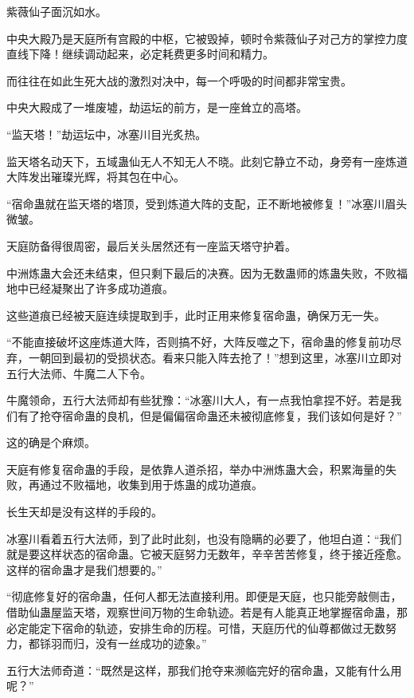 
\begin{this_body}

紫薇仙子面沉如水。

中央大殿乃是天庭所有宫殿的中枢，它被毁掉，顿时令紫薇仙子对己方的掌控力度直线下降！继续调动起来，必定耗费更多时间和精力。

而往往在如此生死大战的激烈对决中，每一个呼吸的时间都非常宝贵。

中央大殿成了一堆废墟，劫运坛的前方，是一座耸立的高塔。

“监天塔！”劫运坛中，冰塞川目光炙热。

监天塔名动天下，五域蛊仙无人不知无人不晓。此刻它静立不动，身旁有一座炼道大阵发出璀璨光辉，将其包在中心。

“宿命蛊就在监天塔的塔顶，受到炼道大阵的支配，正不断地被修复！”冰塞川眉头微皱。

天庭防备得很周密，最后关头居然还有一座监天塔守护着。

中洲炼蛊大会还未结束，但只剩下最后的决赛。因为无数蛊师的炼蛊失败，不败福地中已经凝聚出了许多成功道痕。

这些道痕已经被天庭连续提取到手，此时正用来修复宿命蛊，确保万无一失。

“不能直接破坏这座炼道大阵，否则搞不好，大阵反噬之下，宿命蛊的修复前功尽弃，一朝回到最初的受损状态。看来只能入阵去抢了！”想到这里，冰塞川立即对五行大法师、牛魔二人下令。

牛魔领命，五行大法师却有些犹豫：“冰塞川大人，有一点我怕拿捏不好。若是我们有了抢夺宿命蛊的良机，但是偏偏宿命蛊还未被彻底修复，我们该如何是好？”

这的确是个麻烦。

天庭有修复宿命蛊的手段，是依靠人道杀招，举办中洲炼蛊大会，积累海量的失败，再通过不败福地，收集到用于炼蛊的成功道痕。

长生天却是没有这样的手段的。

冰塞川看着五行大法师，到了此时此刻，也没有隐瞒的必要了，他坦白道：“我们就是要这样状态的宿命蛊。它被天庭努力无数年，辛辛苦苦修复，终于接近痊愈。这样的宿命蛊才是我们想要的。”

“彻底修复好的宿命蛊，任何人都无法直接利用。即便是天庭，也只能旁敲侧击，借助仙蛊屋监天塔，观察世间万物的生命轨迹。若是有人能真正地掌握宿命蛊，那必定能定下宿命的轨迹，安排生命的历程。可惜，天庭历代的仙尊都做过无数努力，都铩羽而归，没有一丝成功的迹象。”

五行大法师奇道：“既然是这样，那我们抢夺来濒临完好的宿命蛊，又能有什么用呢？”


\end{this_body}
